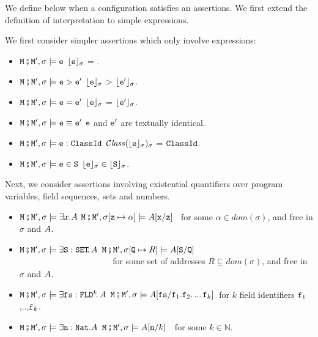 \begin{definition} We define below when a configuration satisfies an assertions. We first extend the definition of interpretation
to simple expressions.
\label{def:valid:assertion}

We first consider simpler assertions which only involve expressions:

\begin{itemize}
\item
$\M\mkpair \M', \sigma \models\SE$ \IFF  $\interp{\SE}{\sigma}$ = .
\item
$\M\mkpair \M', \sigma \models\SE>\SEPrime$ \IFF $\interp{\SE}{\sigma}$ > $\interp{\SEPrime}{\sigma}$.
\item
$\M\mkpair \M', \sigma \models\SE=\SEPrime$ \IFF $\interp{\SE}{\sigma}$ = $\interp{\SEPrime}{\sigma}$.
\item
$\M\mkpair \M', \sigma \models\SE\equiv\SEPrime$ \IFF $\SE$ and $\SEPrime$ are textually identical.
\item
$\M\mkpair \M', \sigma \models \SE:\prg{ClassId}$ \IFF $\ClassOf {\interp{\SE}{\sigma}} {\sigma}$ = $\prg{ClassId}$.
\item
$\M\mkpair \M', \sigma \models \SE\in \prg{S}$ \IFF $\interp{\SE}{\sigma}\in \interp{\prg{S}}{\sigma}$.
\end{itemize}

Next, we consider assertions involving existential quantifiers over program variables, field sequences, sets and numbers.

\begin{itemize}
\item
$\M\mkpair \M', \sigma \models \exists x.\A$ \IFF
$\M\mkpair \M', \sigma[\prg{z}\mapsto \alpha] \models  \A[\prg{x}/\prg{z}]$ \ for some  $\alpha\in dom(\sigma)$, and    free in $\sigma$ and $\A$.\item
$\M\mkpair \M', \sigma \models \exists \prg{S}:\prg{SET}\!.\,\A$ \IFF  $\M\mkpair \M', \sigma[\prg{Q}\mapsto R] \models  \A[\prg{S}/\prg{Q}]$ \\
$\strut ~ \hspace{1.4in} $ for some set of addresses $R\subseteq dom(\sigma)$, and    free in $\sigma$ and $\A$.

\item
$\M\mkpair \M', \sigma \models  \exists \prg{fs}:\prg{FLD}^k\!.\,\A$ \IFF
$\M\mkpair \M', \sigma \models  \A[\prg{fs}/\prg{f}_1.\f_2.\,...\,\prg{f}_k]$\  for  $k$ field identifiers $\prg{f}_1$,..,$\prg{f}_k$.
\item
$\M\mkpair \M', \sigma \models  \exists \prg{n}:\prg{Nat}.\A$ \IFF  $\M\mkpair \M', \sigma \models \A[\prg{n}/k]$\ \ for some $k\in\mathbb{N}$.


\end{itemize}
\end{definition}
